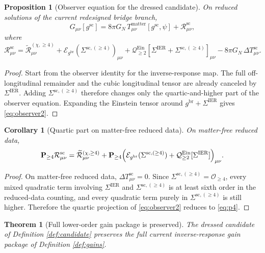 \documentclass[11pt]{article}
\newcommand{\ReBridge}{g^{\mathrm{br}}}
\newcommand{\OpMetricSC}{g^{\mathrm{sc}}}
\newcommand{\SigmaIER}{\Sigma^{\mathrm{IER}}}
\newcommand{\SigmaSRFourSC}{\Sigma^{\mathrm{sc},(\ge 4)}}
\newcommand{\ReLongFour}{\widetilde{\mathcal R}_{\mu\nu}^{(\chi,\ge 4)}}
\newcommand{\EinLin}{\mathcal E_{\ReBridge}}
\newcommand{\EinQuad}{\mathcal Q_{\ge 2}^{\mathrm{Ein}}}
\newcommand{\Pfour}{\mathbf P_{\ge 4}}
\newcommand{\DeltaTSC}{\Delta T_{\mu\nu}^{\mathrm{sc}}}
\newtheorem{proposition}{Proposition}
\newtheorem{corollary}{Corollary}
\newtheorem{theorem}{Theorem}
\begin{document}
\begin{proposition}[Observer equation for the dressed candidate]
\label{prop:observer}
On reduced solutions of the current redesigned bridge branch,
\begin{equation}
G_{\mu\nu}[\OpMetricSC]
=
8\pi G_N\,T_{\mu\nu}^{\mathrm{matter}}[\OpMetricSC,\psi]
+\mathcal R_{\mu\nu}^{\mathrm{sc}},
\label{eq:observer}
\end{equation}
where
\begin{equation}
\mathcal R_{\mu\nu}^{\mathrm{sc}}
=
\ReLongFour
+\EinLin(\SigmaSRFourSC)_{\mu\nu}
+\EinQuad[\SigmaIER+\SigmaSRFourSC]_{\mu\nu}
-8\pi G_N\,\DeltaTSC.
\label{eq:observer2}
\end{equation}
\end{proposition}

\begin{proof}
Start from the observer identity for the inverse-response map. The full off-longitudinal remainder and the cubic longitudinal tensor are already canceled by \(\SigmaIER\). Adding \(\SigmaSRFourSC\) therefore changes only the quartic-and-higher part of the observer equation. Expanding the Einstein tensor around \(\ReBridge+\SigmaIER\) gives \eqref{eq:observer2}.
\end{proof}

\begin{corollary}[Quartic part on matter-free reduced data]
\label{cor:quartic}
On matter-free reduced data,
\begin{equation}
\Pfour \mathcal R_{\mu\nu}^{\mathrm{sc}}
=
\ReLongFour
+\Pfour\Bigl(\EinLin(\SigmaSRFourSC)+\EinQuad[\SigmaIER]\Bigr)_{\mu\nu}.
\label{eq:p4}
\end{equation}
\end{corollary}

\begin{proof}
On matter-free reduced data, \(\DeltaTSC=0\). Since \(\SigmaSRFourSC=\mathcal O_{\ge 4}\), every mixed quadratic term involving \(\SigmaIER\) and \(\SigmaSRFourSC\) is at least sixth order in the reduced-data counting, and every quadratic term purely in \(\SigmaSRFourSC\) is still higher. Therefore the quartic projection of \eqref{eq:observer2} reduces to \eqref{eq:p4}.
\end{proof}

\begin{theorem}[Full lower-order gain package is preserved]
\label{thm:preserve}
The dressed candidate of Definition \ref{def:candidate} preserves the full current inverse-response gain package of Definition \ref{def:gains}.
\end{theorem}
\end{document}
